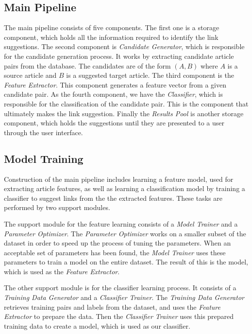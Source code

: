 \subsection{Main Pipeline}
The main pipeline consists of five components. The first one is a storage component, which holds all the information required to identify the link suggestions. The second component is \emph{Candidate Generator}, which is responsible for the candidate generation process. It works by extracting candidate article pairs from the database. The candidates are of the form $(A,B)$ where $A$ is a source article and $B$ is a suggested target article. The third component is the \emph{Feature Extractor}. This component generates a feature vector from a given candidate pair. As the fourth component, we have the \emph{Classifier}, which is responsible for the classification of the candidate pair. This is the component that ultimately makes the link suggestion. Finally the \emph{Results Pool} is another storage component, which holds the suggestions until they are presented to a user through the user interface.

\subsection{Model Training}
Construction of the main pipeline includes learning a feature model, used for extracting article features, as well as learning a classification model by training a classifier to suggest links from the the extracted features. These tasks are performed by two support modules.

The support module for the feature learning consists of a \emph{Model Trainer} and a \emph{Parameter Optimizer}. The \emph{Parameter Optimizer} works on a smaller subset of the dataset in order to speed up the process of tuning the parameters. When an acceptable set of parameters has been found, the \emph{Model Trainer} uses these parameters to train a model on the entire dataset. The result of this is the model, which is used as the \emph{Feature Extractor}.

The other support module is for the classifier learning process. It consists of a \emph{Training Data Generator} and a \emph{Classifier Trainer}. The \emph{Training Data Generator} retrieves training pairs and labels from the dataset, and uses the \emph{Feature Extractor} to prepare the data. Then the \emph{Classifier Trainer} uses this prepared training data to create a model, which is used as our classifier.

